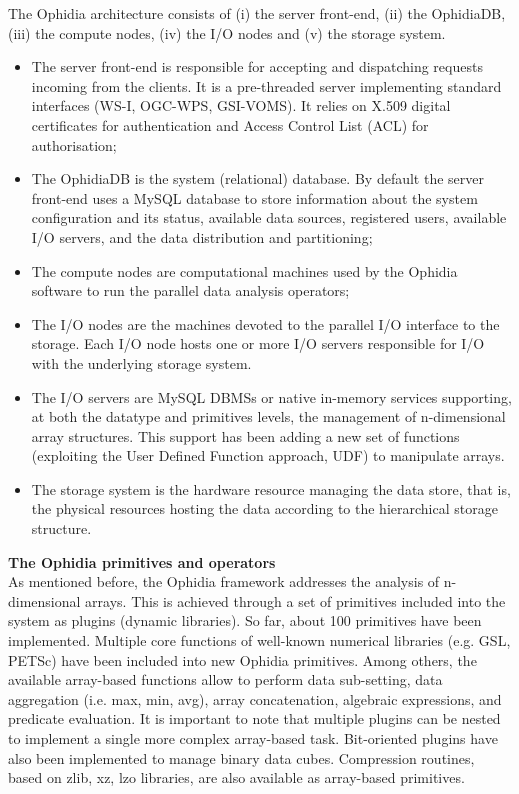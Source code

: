 The Ophidia architecture consists of (i) the server front-end, (ii) the OphidiaDB, (iii) the compute nodes, (iv) the I/O nodes and (v) the storage system.
\begin{itemize}
	\item The server front-end is responsible for accepting and dispatching requests incoming from the clients. It is a pre-threaded server implementing standard interfaces (WS-I, OGC-WPS, GSI-VOMS). It relies on X.509 digital certificates for authentication and Access Control List (ACL) for authorisation;
	\item The OphidiaDB is the system (relational) database. By default the server front-end uses a MySQL database to store information about the system configuration and its status, available data sources, registered users, available I/O servers, and the data distribution and partitioning;
	\item The compute nodes are computational machines used by the Ophidia software to run the parallel data analysis operators;
	\item The I/O nodes are the machines devoted to the parallel I/O interface to the storage. Each I/O node hosts one or more I/O servers responsible for I/O with the underlying storage system. %
	\item The I/O servers are MySQL DBMSs or native in-memory services \cite{DBLP:conf/cd/EliaFDPFW16} supporting, at both the datatype and primitives levels, the management of n-dimensional array structures. This support has been adding a new set of functions (exploiting the User Defined Function approach, UDF) to manipulate arrays.
	\item The storage system is the hardware resource managing the data store, that is, the physical resources hosting the data according to the hierarchical storage structure. %
\end{itemize}

\textbf{The Ophidia primitives and operators}\\

As mentioned before, the Ophidia framework addresses the analysis of n-dimensional arrays. This is achieved through a set of primitives included into the system as plugins (dynamic libraries). So far, about 100 primitives have been implemented. Multiple core functions of well-known numerical libraries (e.g. GSL, PETSc) have been included into new Ophidia primitives. Among others, the available array-based functions allow to perform data sub-setting, data aggregation (i.e. max, min, avg), array concatenation, algebraic expressions, and predicate evaluation. It is important to note that multiple plugins can be nested to implement a single more complex array-based task.
Bit-oriented plugins have also been implemented to manage binary data cubes. Compression routines, based on zlib, xz, lzo libraries, are also available as array-based primitives.\\


